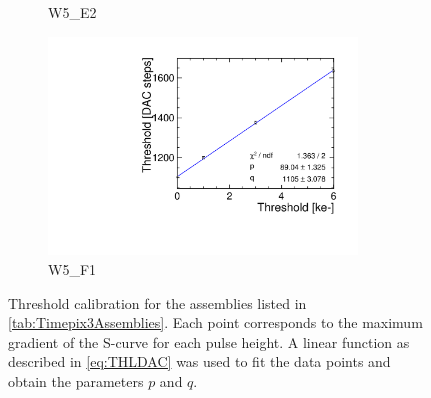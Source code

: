 \begin{figure}[htbp]
\begin{subfigure}[b]{0.45\textwidth}
    \caption{W5\_E2}
  \end{subfigure} \hfill
  \begin{subfigure}[b]{0.45\textwidth}
    \includegraphics[width=0.9\textwidth]{./figures/Calibration/THLcalibration_W0005_F01.pdf}
    \caption{W5\_F1}
  \end{subfigure}%
  \caption{Threshold calibration for the assemblies listed in
    \cref{tab:Timepix3Assemblies}. Each point corresponds to the
    maximum gradient of the S-curve for each pulse height. A linear
    function as described in \cref{eq:THLDAC} was used to fit the data
    points and obtain the parameters $p$ and $q$.}
  \label{fig:Timepix3_THL_Calibration}
\end{figure}






